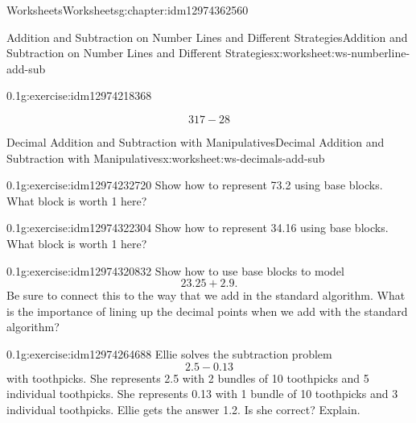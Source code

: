\documentclass[twoside,11pt,]{book}
\begin{document}
\begin{chapterptx}{Worksheets}{}{Worksheets}{}{}{g:chapter:idm12974362560}
\begin{worksheet-section-numberless}{Addition and Subtraction on Number Lines and Different Strategies}{}{Addition and Subtraction on Number Lines and Different Strategies}{}{}{x:worksheet:ws-numberline-add-sub}
\begin{divisionexercise}{3}{}{0.1}{g:exercise:idm12974218368}
\begin{enumerate}[label=(\alph*)]
\begin{equation*}
317-28
\end{equation*}
%
\end{enumerate}
\end{divisionexercise}%
\end{worksheet-section-numberless}
\restoregeometry
%
%
\typeout{************************************************}
\typeout{************************************************}
%
\begin{worksheet-section-numberless}{Decimal Addition and Subtraction with Manipulatives}{}{Decimal Addition and Subtraction with Manipulatives}{}{}{x:worksheet:ws-decimals-add-sub}
\begin{divisionexercise}{1}{}{0.1}{g:exercise:idm12974232720}%
Show how to represent 73.2 using base blocks.  What block is worth 1 here?%
\end{divisionexercise}%
\begin{divisionexercise}{2}{}{0.1}{g:exercise:idm12974322304}%
Show how to represent 34.16 using base blocks.  What block is worth 1 here?%
\end{divisionexercise}%
\begin{divisionexercise}{3}{}{0.1}{g:exercise:idm12974320832}%
Show how to use base blocks to model%
\begin{equation*}
23.25+2.9\text{.}
\end{equation*}
Be sure to connect this to the way that we add in the standard algorithm.  What is the importance of lining up the decimal points when we add with the standard algorithm?%
\end{divisionexercise}%
\begin{divisionexercise}{4}{}{0.1}{g:exercise:idm12974264688}%
Ellie solves the subtraction problem%
\begin{equation*}
2.5-0.13
\end{equation*}
with toothpicks.  She represents 2.5 with 2 bundles of 10 toothpicks and 5 individual toothpicks.  She represents 0.13 with 1 bundle of 10 toothpicks and 3 individual toothpicks.  Ellie gets the answer 1.2.  Is she correct?  Explain.%
\end{divisionexercise}%
\end{worksheet-section-numberless}
\restoregeometry
%
%
\typeout{************************************************}
\typeout{************************************************}

\end{chapterptx}
\end{document}
